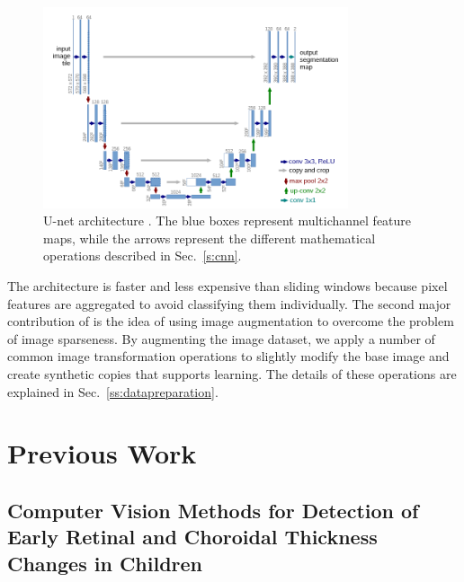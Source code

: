 \documentclass[12pt,a4paper]{scrartcl}
\begin{document}
\begin{figure}[H]
    \centering
    \includegraphics[width=0.8\textwidth]{./images/Unet-architecture.png}
    \caption{U-net architecture \cite{Ronneberger2015}. The blue boxes represent multichannel feature maps, while the arrows represent the different mathematical operations described in Sec.~\ref{s:cnn}.    }
\end{figure}

The architecture is faster and less expensive than sliding windows because pixel features are aggregated to avoid classifying them individually. The second major contribution of \cite{Ronneberger2015} is the idea of using image augmentation to overcome the problem of image sparseness. By augmenting the image dataset, we apply a number of common image transformation operations to slightly modify the base image and create synthetic copies that supports learning. The details of these operations are explained in Sec.~\ref{ss:datapreparation}.

\section{Previous Work}\label{s:prevWork}
\subsection{Computer Vision Methods for Detection of Early Retinal and Choroidal Thickness Changes in Children}
\end{document}

